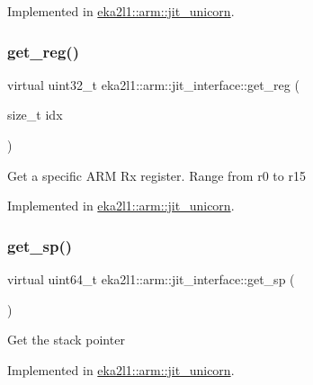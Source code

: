Implemented in \mbox{\hyperlink{classeka2l1_1_1arm_1_1jit__unicorn_a8429f8e0e5aafa264929336aaafc2e24}{eka2l1\+::arm\+::jit\+\_\+unicorn}}.

\mbox{\label{classeka2l1_1_1arm_1_1jit__interface_ae68ac4dc5fdb598d36aef40689694f6b}} 
\subsubsection{\texorpdfstring{get\+\_\+reg()}{get\_reg()}}
{\footnotesize\ttfamily virtual uint32\+\_\+t eka2l1\+::arm\+::jit\+\_\+interface\+::get\+\_\+reg (\begin{DoxyParamCaption}\item[{size\+\_\+t}]{idx }\end{DoxyParamCaption})\hspace{0.3cm}{\ttfamily [pure virtual]}}

Get a specific A\+RM Rx register. Range from r0 to r15 

Implemented in \mbox{\hyperlink{classeka2l1_1_1arm_1_1jit__unicorn_a94a0495c63ad80defc3afd71b7a89d04}{eka2l1\+::arm\+::jit\+\_\+unicorn}}.

\mbox{\label{classeka2l1_1_1arm_1_1jit__interface_a68ea503b77c6f3014293c41eda739476}} 
\subsubsection{\texorpdfstring{get\+\_\+sp()}{get\_sp()}}
{\footnotesize\ttfamily virtual uint64\+\_\+t eka2l1\+::arm\+::jit\+\_\+interface\+::get\+\_\+sp (\begin{DoxyParamCaption}{ }\end{DoxyParamCaption})\hspace{0.3cm}{\ttfamily [pure virtual]}}

Get the stack pointer 

Implemented in \mbox{\hyperlink{classeka2l1_1_1arm_1_1jit__unicorn_a2ce8f21025bc1d4a6cf0e404cef6f3ab}{eka2l1\+::arm\+::jit\+\_\+unicorn}}.


